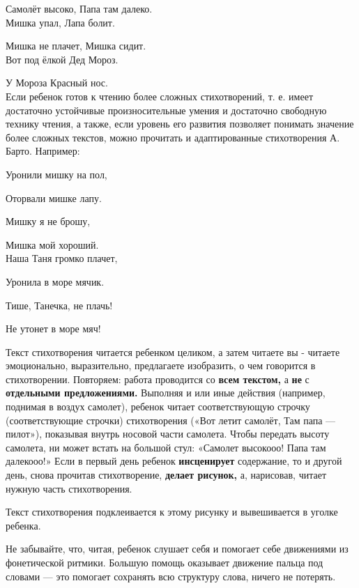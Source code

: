 \documentclass{book}
\begin{document}
Самолёт высоко, Папа там далеко.\\

Мишка упал, Лапа болит.

Мишка не плачет, Мишка сидит.\\

Вот под ёлкой Дед Мороз.

У Мороза Красный нос.\\



Если ребенок готов к чтению более сложных стихотворений, т. е. имеет
достаточно устойчивые произносительные умения и достаточно свободную
технику чтения, а также, если уровень его развития позволяет понимать
значение более сложных текстов, можно прочитать и адаптированные
стихотворения А. Барто. Например:



Уронили мишку на пол,

Оторвали мишке лапу.

Мишку я не брошу,

Мишка мой хороший.\\




Наша Таня громко плачет,

Уронила в море мячик.

Тише, Танечка, не плачь!

Не утонет в море мяч!





Текст стихотворения читается ребенком целиком, а затем читаете вы -
читаете эмоционально, выразительно, предлагаете изобразить, о чем
говорится в стихотворении. Повторяем: работа проводится со \textbf{всем
текстом,} а \textbf{не} с \textbf{отдельными предложениями.} Выполняя и
или иные действия (например, поднимая в воздух самолет), ребенок читает
соответствующую строчку (соответствующие строчки) стихотворения («Вот
летит самолёт, Там папа --- пилот»), показывая внутрь носовой части
самолета. Чтобы передать высоту самолета, ни может встать на большой
стул: «Самолет высокооо! Папа там далекооо!» Если в первый день ребенок
\textbf{инсценирует} содержание, то и другой день, снова прочитав
стихотворение, \textbf{делает рисунок,} а, нарисовав, читает нужную
часть стихотворения.

Текст стихотворения подклеивается к этому рисунку и вывешивается в
уголке ребенка.

Не забывайте, что, читая, ребенок слушает себя и помогает себе
движениями из фонетической ритмики. Большую помощь оказывает движение
пальца под словами --- это помогает сохранять всю структуру слова,
ничего не потерять.
\end{document}
